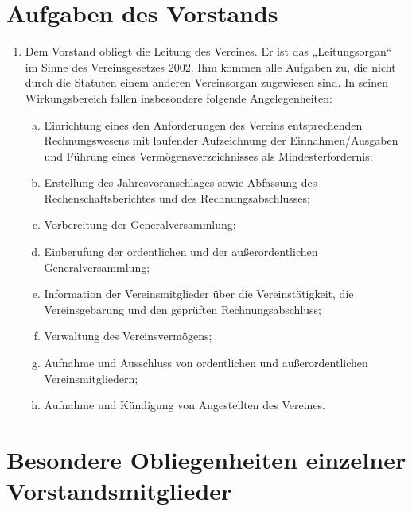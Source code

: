 \documentclass[a4paper,12pt]{article}
\newcommand{\comment}[1]{{\bf /*Komm.:} \textit{#1} {\bf */}}
\def\comment#1{}
\begin{document}
\section{Aufgaben des Vorstands} %
\begin{enumerate}
\item Dem Vorstand obliegt die Leitung des Vereines. Er ist das „Leitungsorgan“ im Sinne des Vereinsgesetzes 2002. Ihm kommen alle Aufgaben zu, die nicht durch die Statuten einem anderen Vereinsorgan zugewiesen sind. In seinen Wirkungsbereich fallen insbesondere folgende Angelegenheiten:
\comment{Änderungen : weitgehend Anpassungen an BMI orig. Vorlage}
	\begin{enumerate}[(a)]
	\item Einrichtung eines den Anforderungen des Vereins entsprechenden Rechnungswesens mit laufender Aufzeichnung der Einnahmen/Ausgaben und Führung eines Vermögensverzeichnisses als Mindesterfordernis;
	\item Erstellung des Jahresvoranschlages sowie Abfassung des Rechenschaftsberichtes und des Rechnungsabschlusses;
	\item Vorbereitung der Generalversammlung;
	\item Einberufung der ordentlichen und der außerordentlichen Generalversammlung;
	\item Information der Vereinsmitglieder über die Vereinstätigkeit, die Vereinsgebarung und den geprüften Rechnungsabschluss;
	\item Verwaltung des Vereinsvermögens;
	\item Aufnahme und Ausschluss von ordentlichen und außerordentlichen Vereinsmitgliedern;
	\item Aufnahme und Kündigung von Angestellten des Vereines.
	\end{enumerate}
\end{enumerate}

\section{Besondere Obliegenheiten einzelner Vorstandsmitglieder} %
\comment{ Dieser Abschnitt enthält Zeichnungsberechtigungen, explizite Aufgaben und Berechtigungen der Vorstandsmitglieder usw... }
\end{document}
